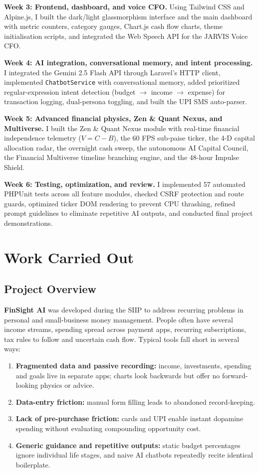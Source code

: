 \documentclass[12pt,a4paper]{report}
\begin{document}
\textbf{Week 3: Frontend, dashboard, and voice CFO.}
Using Tailwind CSS and Alpine.js, I built the dark/light glassmorphism interface and the main dashboard with metric counters, category gauges, Chart.js cash flow charts, theme initialisation scripts, and integrated the Web Speech API for the JARVIS Voice CFO.

\textbf{Week 4: AI integration, conversational memory, and intent processing.}
I integrated the Gemini 2.5 Flash API through Laravel's HTTP client, implemented \texttt{ChatbotService} with conversational memory, added prioritized regular-expression intent detection (budget $\rightarrow$ income $\rightarrow$ expense) for transaction logging, dual-persona toggling, and built the UPI SMS auto-parser.

\textbf{Week 5: Advanced financial physics, Zen \& Quant Nexus, and Multiverse.}
I built the Zen \& Quant Nexus module with real-time financial independence telemetry ($V=C-B$), the 60 FPS sub-paise ticker, the 4-D capital allocation radar, the overnight cash sweep, the autonomous AI Capital Council, the Financial Multiverse timeline branching engine, and the 48-hour Impulse Shield.

\textbf{Week 6: Testing, optimization, and review.}
I implemented 57 automated PHPUnit tests across all feature modules, checked CSRF protection and route guards, optimized ticker DOM rendering to prevent CPU thrashing, refined prompt guidelines to eliminate repetitive AI outputs, and conducted final project demonstrations.

\chapter{Work Carried Out}\label{ch4}

\section{Project Overview}\label{s41}

\textbf{FinSight AI} was developed during the SIIP to address recurring problems in personal and small-business money management. People often have several income streams, spending spread across payment apps, recurring subscriptions, tax rules to follow and uncertain cash flow. Typical tools fall short in several ways:
\begin{enumerate}[leftmargin=*]
    \item \textbf{Fragmented data and passive recording:} income, investments, spending and goals live in separate apps; charts look backwards but offer no forward-looking physics or advice.
    \item \textbf{Data-entry friction:} manual form filling leads to abandoned record-keeping.
    \item \textbf{Lack of pre-purchase friction:} cards and UPI enable instant dopamine spending without evaluating compounding opportunity cost.
    \item \textbf{Generic guidance and repetitive outputs:} static budget percentages ignore individual life stages, and naive AI chatbots repeatedly recite identical boilerplate.
\end{enumerate}
\end{document}
